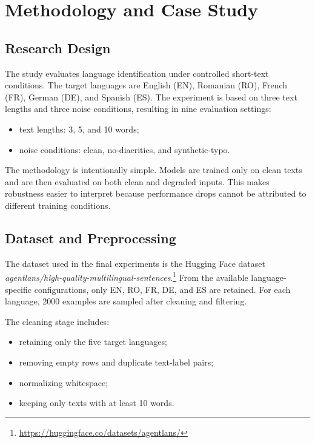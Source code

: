 \documentclass[conference]{IEEEtran}
\begin{document}
\section{Methodology and Case Study}
\label{sec:method}

\subsection{Research Design}

The study evaluates language identification under controlled short-text conditions. The target languages are English (EN), Romanian (RO), French (FR), German (DE), and Spanish (ES). The experiment is based on three text lengths and three noise conditions, resulting in nine evaluation settings:

\begin{itemize}
    \item text lengths: 3, 5, and 10 words;
    \item noise conditions: clean, no-diacritics, and synthetic-typo.
\end{itemize}

The methodology is intentionally simple. Models are trained only on clean texts and are then evaluated on both clean and degraded inputs. This makes robustness easier to interpret because performance drops cannot be attributed to different training conditions.

\subsection{Dataset and Preprocessing}

The dataset used in the final experiments is the Hugging Face dataset \emph{agentlans/high-quality-multilingual-sentences}.\footnote{\url{https://huggingface.co/datasets/agentlans/}} From the available language-specific configurations, only EN, RO, FR, DE, and ES are retained. For each language, 2000 examples are sampled after cleaning and filtering.

The cleaning stage includes:

\begin{itemize}
    \item retaining only the five target languages;
    \item removing empty rows and duplicate text-label pairs;
    \item normalizing whitespace;
    \item keeping only texts with at least 10 words.
\end{itemize}
\end{document}
